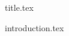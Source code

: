 \documentclass[a4paper,12pt]{article}
\begin{document}
{title.tex}

\newpage



\newpage
\vfill
\tableofcontents
\vfill
\newpage
\listoffigures

\newpage
{}



{introduction.tex}
\end{document}
